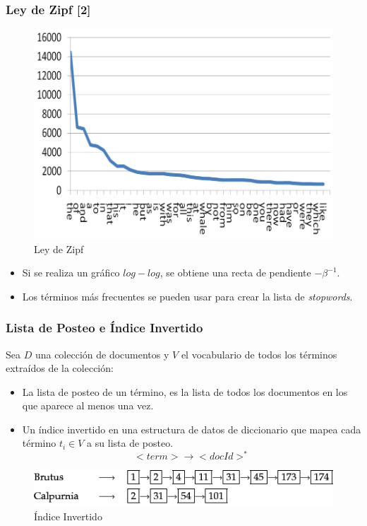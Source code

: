 \documentclass[handout]{beamer}
\begin{document}
\begin{frame}\frametitle{Ley de Zipf [2]}
\footnotesize{

\begin{figure}[h!]
	\centering
	\includegraphics[scale=0.5]{pics/zipf1.png}
	\caption{Ley de Zipf}
\end{figure}
\begin{itemize}
 \item Si se realiza un gráfico $log-log$, se obtiene una recta de pendiente  $-\beta^{-1}$.
 \item Los términos más frecuentes se pueden usar para crear la lista de \emph{stopwords}. 
\end{itemize}
}



 
\end{frame}

\begin{frame}\frametitle{Lista de Posteo e Índice Invertido}
{\footnotesize Sea $D$ una colección de documentos y $V$ el vocabulario de todos los términos extraídos de la colección:

\begin{itemize}
 \item La lista de posteo de un término, es la lista de todos los documentos en los que aparece al menos una vez.
 \item Un índice invertido en una estructura de datos de diccionario que mapea cada término $t_{i} \in V$ a su lista de posteo. 
 \begin{displaymath}
  <term> \rightarrow <docId>^*
 \end{displaymath}

\end{itemize}

\begin{figure}[h!]
	\centering
	\includegraphics[scale=0.6]{pics/invFile.png}
	\caption{ Índice Invertido}
\end{figure}



}
\end{frame}
\end{document}
